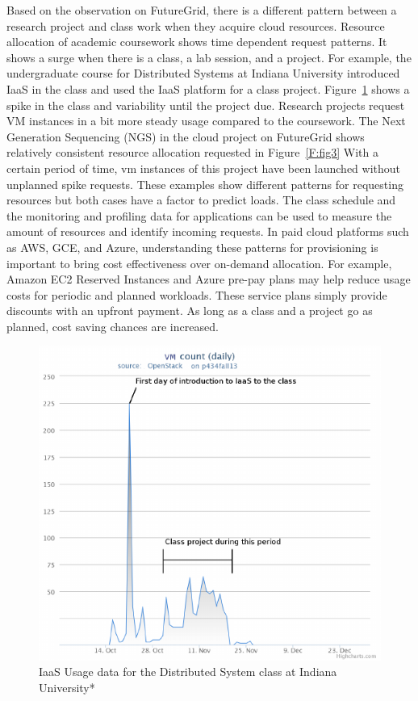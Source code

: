 \documentclass{sig-alternate}
\begin{document}
Based on the observation on FutureGrid, there is a different pattern between a research project and class work when they acquire cloud resources.  Resource allocation of academic coursework shows time dependent request patterns. It shows a surge when there is a class, a lab session, and a project. For example, the undergraduate course for Distributed Systems at Indiana University introduced IaaS in the class and used the IaaS platform for a class project. Figure~\ref{F:fig2} shows a spike in the class and variability until the project due. Research projects request VM instances in a bit more steady usage compared to the coursework. The Next Generation Sequencing (NGS) in the cloud project on FutureGrid shows relatively consistent resource allocation requested in Figure~\ref{F:fig3} With a certain period of time, vm instances of this project have been launched without unplanned spike requests. These examples show different patterns for requesting resources but both cases have a factor to predict loads. The class schedule and the monitoring and profiling data for applications can be used to measure the amount of resources and identify incoming requests. In paid cloud platforms such as AWS, GCE, and Azure, understanding these patterns for provisioning is important to bring cost effectiveness over on-demand allocation. For example, Amazon EC2 Reserved Instances and Azure pre-pay plans may help reduce usage costs for periodic and planned workloads. These service plans simply provide discounts with an upfront payment. As long as a class and a project go as planned, cost saving chances are increased. 

\begin{figure}[h!] 
  \centering 
    \includegraphics[width=1.0\columnwidth]{images/fig1.pdf} 
  \caption{IaaS Usage data for the Distributed System class at Indiana University*}\label{F:fig2} 
\end{figure} 
\end{document}
